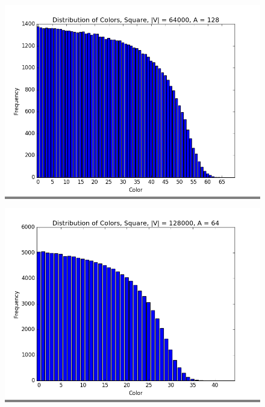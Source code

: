 \documentclass{article}
\begin{document}
\begin{figure}
\begin{minipage}{0.3\textwidth}
    \colorbox{gray}{\includegraphics[width=\linewidth]{./graphs/hist_colors_square_4.png}}
    \end{minipage}
    \hspace{\fill}
    \begin{minipage}{0.3\textwidth}
    \colorbox{gray}{\includegraphics[width=\linewidth]{./graphs/hist_colors_square_5.png}}
    \end{minipage}
    \vskip 0.1in
    \begin{minipage}{0.3\textwidth}

\end{minipage}
\end{figure}
\end{document}
